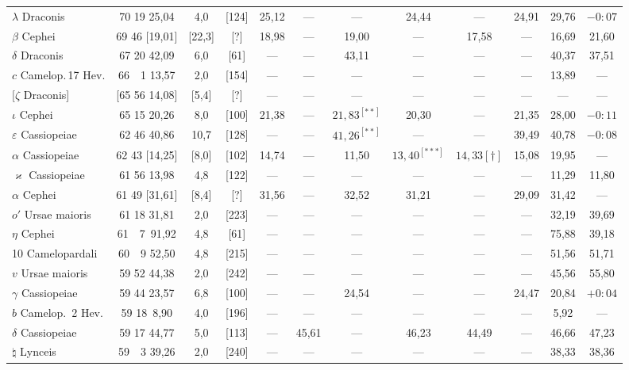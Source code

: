 \documentclass[12pt,a4paper]{article}
\theoremstyle{plain}
\theoremstyle{definition}
\theoremstyle{remark}
\begin{document}
\begin{center}
{\begin{longtable}{l|c|c|c|c|c|c|c|c|c|c|c}
$\lambda$ Draconis & 70 19 25,04 & 4,0 & [124] & 25,12 & --- & --- & 24,44 & --- & 24,91 & 29,76 & $-0\!\!:\!\!07$ \\
$\beta$ Cephei & 69 46 [19,01] & [22,3] & [?] & 18,98 & --- & 19,00 & --- & 17,58 & --- & 16,69 & 21,60 \\
$\delta$ Draconis & 67 20 42,09 & 6,0 & [61] & --- & --- & 43,11 & --- & --- & --- & 40,37 & 37,51 \\
$c$ Camelop.\,17 Hev. & 66\ \ 1 13,57 & 2,0 & [154] & --- & --- & --- & --- & --- & --- & 13,89 & --- \\
$[\zeta$ Draconis] & [65 56 14,08] & [5,4] & [?] & --- & --- & --- & --- & --- & --- & --- & --- \\
$\iota$ Cephei & 65 15 20,26 & 8,0 & [100] & 21,38 & --- & $21,83^{[**]}$ & 20,30 & --- & 21,35 & 28,00 & $-0\!\!:\!\!11$ \\
$\varepsilon$ Cassiopeiae & 62 46 40,86 & 10,7 & [128] & --- & --- & $41,26^{[**]}$ & --- & --- & 39,49 & 40,78 & $-0\!\!:\!\!08$ \\
$\alpha$ Cassiopeiae & 62 43 [14,25] & [8,0] & [102] & 14,74 & --- & 11,50 & $13,40^{[***]}$ & $14,33[\dagger]$ & 15,08 & 19,95 & --- \\
$\varkappa$ Cassiopeiae & 61 56 13,98 & 4,8 & [122] & --- & --- & --- & --- & --- & --- & 11,29 & 11,80 \\
$\alpha$ Cephei & 61 49 [31,61] & [8,4] & [?] & 31,56 & --- & 32,52 & 31,21 & --- & 29,09 & 31,42 & --- \\
$o'$ Ursae maioris & 61 18 31,81 & 2,0 & [223] & --- & --- & --- & --- & --- & --- & 32,19 & 39,69 \\
$\eta$ Cephei & 61\ \ 7\quad\, 91,92 & 4,8 & [61] & --- & --- & --- & --- & --- & --- & 75,88 & 39,18 \\
10 Camelopardali & 60\ \ 9 52,50 & 4,8 & [215] & --- & --- & --- & --- & --- & --- & 51,56 & 51,71 \\
$v$ Ursae maioris & 59 52 44,38 & 2,0 & [242] & --- & --- & --- & --- & --- & --- & 45,56 & 55,80 \\
$\gamma$ Cassiopeiae & 59 44 23,57 & 6,8 & [100] & --- & --- & 24,54 & --- & --- & 24,47 & 20,84 & $+0\!\!:\!\!04$ \\
$b$ Camelop.\ 2 Hev. & 59 18\quad\, 8,90 & 4,0 & [196] & --- & --- & --- & --- & --- & --- & 5,92 & --- \\
$\delta$ Cassiopeiae & 59 17 44,77 & 5,0 & [113] & --- & 45,61 & --- & 46,23 & 44,49 & --- & 46,66 & 47,23 \\
$\natural$ Lynceis & 59\ \ 3 39,26 & 2,0 & [240] & --- & --- & --- & --- & --- & --- & 38,33 & 38,36 \\

\end{longtable}}
\end{center}
\end{document}
